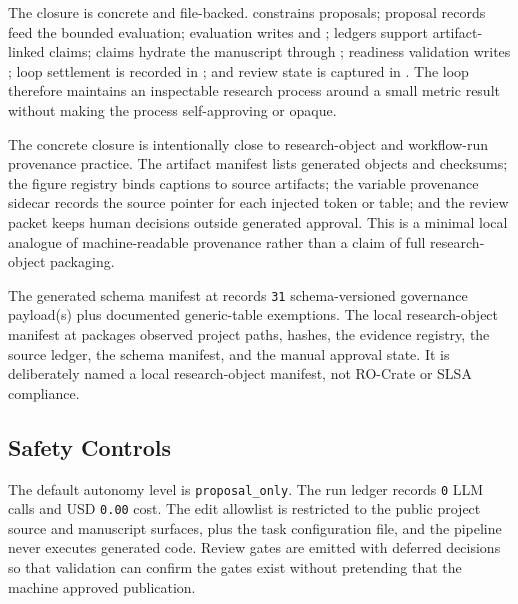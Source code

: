 \documentclass[
]{article}
\begin{document}
The closure is concrete and file-backed.
 constrains proposals;
proposal records feed the bounded evaluation; evaluation writes
 and
; ledgers support artifact-linked
claims; claims hydrate the manuscript through
; readiness validation
writes ; loop
settlement is recorded in
; and review state
is captured in . The loop
therefore maintains an inspectable research process around a small
metric result without making the process self-approving or opaque.

The concrete closure is intentionally close to research-object and
workflow-run provenance practice. The artifact manifest lists generated
objects and checksums; the figure registry binds captions to source
artifacts; the variable provenance sidecar records the source pointer
for each injected token or table; and the review packet keeps human
decisions outside generated approval. This is a minimal local analogue
of machine-readable provenance rather than a claim of full
research-object packaging.

The generated schema manifest at
 records
\texttt{31} schema-versioned governance payload(s) plus documented
generic-table exemptions. The local research-object manifest at
 packages observed
project paths, hashes, the evidence registry, the source ledger, the
schema manifest, and the manual approval state. It is deliberately named
a local research-object manifest, not RO-Crate or SLSA compliance.

\subsection{Safety Controls}\label{sec:safety-controls}

The default autonomy level is \texttt{proposal\_only}. The run ledger
records \texttt{0} LLM calls and USD \texttt{0.00} cost. The edit
allowlist is restricted to the public project source and manuscript
surfaces, plus the task configuration file, and the pipeline never
executes generated code. Review gates are emitted with deferred
decisions so that validation can confirm the gates exist without
pretending that the machine approved publication.
\end{document}
